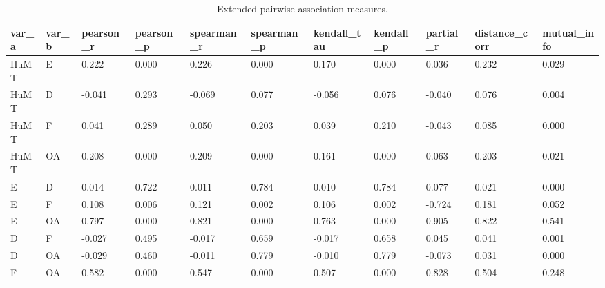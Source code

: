 \begin{table}[t]
\centering
\caption{Extended pairwise association measures.}
\label{tab:pairwise_assoc}
\begin{tabular}{lllllllllll}
\toprule
var\_a & var\_b & pearson\_r & pearson\_p & spearman\_r & spearman\_p & kendall\_tau & kendall\_p & partial\_r & distance\_corr & mutual\_info \\
\midrule
HuMT & E & 0.222 & 0.000 & 0.226 & 0.000 & 0.170 & 0.000 & 0.036 & 0.232 & 0.029 \\
HuMT & D & -0.041 & 0.293 & -0.069 & 0.077 & -0.056 & 0.076 & -0.040 & 0.076 & 0.004 \\
HuMT & F & 0.041 & 0.289 & 0.050 & 0.203 & 0.039 & 0.210 & -0.043 & 0.085 & 0.000 \\
HuMT & OA & 0.208 & 0.000 & 0.209 & 0.000 & 0.161 & 0.000 & 0.063 & 0.203 & 0.021 \\
E & D & 0.014 & 0.722 & 0.011 & 0.784 & 0.010 & 0.784 & 0.077 & 0.021 & 0.000 \\
E & F & 0.108 & 0.006 & 0.121 & 0.002 & 0.106 & 0.002 & -0.724 & 0.181 & 0.052 \\
E & OA & 0.797 & 0.000 & 0.821 & 0.000 & 0.763 & 0.000 & 0.905 & 0.822 & 0.541 \\
D & F & -0.027 & 0.495 & -0.017 & 0.659 & -0.017 & 0.658 & 0.045 & 0.041 & 0.001 \\
D & OA & -0.029 & 0.460 & -0.011 & 0.779 & -0.010 & 0.779 & -0.073 & 0.031 & 0.000 \\
F & OA & 0.582 & 0.000 & 0.547 & 0.000 & 0.507 & 0.000 & 0.828 & 0.504 & 0.248 \\
\bottomrule
\end{tabular}
\end{table}
